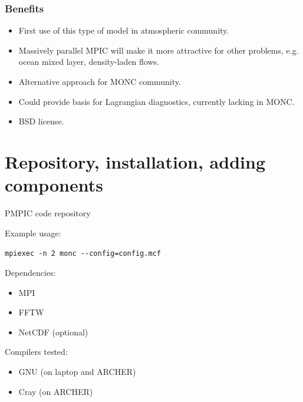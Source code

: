 \documentclass{beamer}
\def\gr#1{\color{dark_green} #1}
\def\re#1{\color{red}   #1}
\def\bl#1{\color{blue}  #1}
\def\pu#1{\color{purple} #1}
\providecommand{\tightlist}{%
  \setlength{\itemsep}{0pt}\setlength{\parskip}{0pt}}
\begin{document}
\begin{frame}
\frametitle{Benefits}

\begin{itemize}
\item First use of this type of model in atmospheric community.
\item Massively parallel MPIC will make it more attractive for {\pu other problems}, e.g. ocean mixed layer, density-laden flows.
\item {\bl Alternative approach} for MONC community.
\item Could provide basis for Lagrangian diagnostics, currently {\re lacking in MONC}.
\item {\gr BSD} license.
\end{itemize}

\end{frame}

\hypertarget{welcome-to-the-pmpic-wiki}{%
\section{Repository, installation, adding components}\label{welcome-to-the-pmpic-wiki}}

\begin{frame}{PMPIC code repository}
\protect\hypertarget{pmpic-code-repository}{}

Example usage:

\texttt{mpiexec -n 2 monc  -\/-config=config.mcf}

Dependencies:

\begin{itemize}
\tightlist
\item
  MPI
\item
  FFTW
\item
  NetCDF (optional)
\end{itemize}

Compilers tested:

\begin{itemize}
\tightlist
\item
  GNU (on laptop and ARCHER)
\item
  Cray (on ARCHER)
\end{itemize}

\end{frame}
\end{document}
